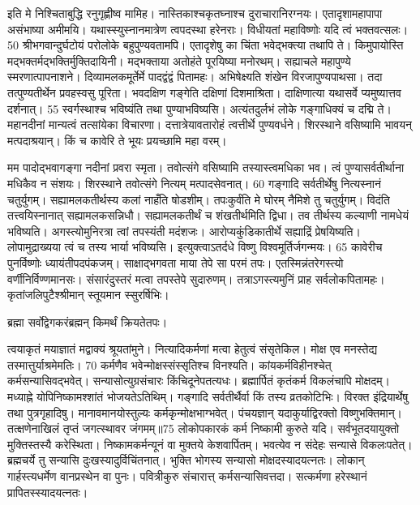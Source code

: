 इति मे निश्चिताबुद्धि रनुगृह्णीष्व मामिह।
 नास्तिकाश्चकृतघ्नाश्च दुराचारानिरग्नयः।
 एतादृशामहापापा असंभाष्या अमीमयि।
 यथास्स्युस्नानमात्रेण त्वपदस्था हरेनराः।
 विधीयतां महाविष्णोः यदि त्वं भक्तवत्सलः।
 50 श्रीभगवान्दुर्घटोयं परोलोके बहुपुण्यवतामपि।
 एतादृशेषु का चिंता भवेद्भक्त्या तथापि ते।
 किमुपायोस्ति मद्भक्तर्मद्भक्तिर्मुक्तिदायिनी।
 मद्भक्ताया अतोहंते पूरयिष्या मनोरथम्।
 सह्याचले महापुण्ये स्मरणात्पापनाशने।
 दिव्यामलकमूर्तेर्मे पादद्वंद्वं पितामहः।
 अभिषेक्ष्यति शंखेन विरजापुण्यपाथसा।
 तदा तत्पुण्यतीर्थेन प्रवहस्वसु पूरिता।
 भवदक्षिण गङ्गेति दक्षिणां दिशमाश्रिता।
 दाक्षिणात्या यथासर्वे प्यमुष्यात्तव दर्शनात्।
 55 स्वर्गस्थाश्च भविष्यंति तथा पुण्याभविष्यसि।
 अत्यंतदुर्लभं लोके गङ्गाधिक्यं च दद्मि ते।
 महानदीनां मान्यत्वं तत्सांयेका विचारणा।
 दत्तात्रेयावतारोहं त्वत्तीर्थे पुण्यवर्धने।
 शिरस्थाने वसिष्यामि भावयन् मत्पदाश्रयान्।
 किं च कावेरि ते भूयः प्रयच्छामि महा वरम्।
 
मम पादोद्भवागङ्गा नदीनां प्रवरा स्मृता।
 तवोत्संगे वसिष्यामि तस्यास्त्वमधिका भव।
 त्वं पुण्यासर्वतीर्थाना मधिकैव न संशयः।
 शिरस्थाने तवोत्संगे नित्यम् मत्पादसेवनात्।
 60 गङ्गादि सर्वतीर्थेषु नित्यस्नानं चतुर्युगम्।
 सह्यामलकतीर्थस्य कलां नाहँति षोडशीम्।
 तपःकुर्वंति मे घोरम् नैमिशे तु चतुर्युगम्।
 विदंति तत्त्वयिस्नानात् सह्यामलकसन्निधौ।
 सह्यामलकतीर्थं च शंखतीर्थमिति द्विधा।
 तव तीर्थस्य कल्याणी नामधेयं भविष्यति।
 अगस्त्योमुनिरत्रा त्वां तपस्यंती मदंशजः।
 आरोप्यकुंडिकातीर्थे सह्याद्रिं प्रेषयिष्यति।
 लोपामुद्राख्यया त्वं च तस्य भार्या भविष्यसि।
 इत्युक्त्वाऽतर्दधे विष्णु विश्वमूर्तिर्जगन्मयः।
 65 कावेरीच पुनर्विष्णोः ध्यायंतीपदपंकजम्।
 साक्षाद्भगवता माया तेपे सा परमं तपः।
 एतस्मिन्नंतरेगस्त्यो वर्णीनिर्विण्णमानसः।
 संसारंदुस्तरं मत्वा तपस्तेपे सुदारुणम्।
 तत्राऽगस्त्यमुनिं प्राह सर्वलोकपितामहः।
 कृतांजलिपुटैश्श्रीमान् स्तूयमान स्सुरर्षिभिः।
 
ब्रह्मा
सर्वोद्वेगकरंब्रह्मन् किमर्थं क्रियतेतपः।

त्वयाकृतं मयाज्ञातं मद्वाक्यं श्रूयतांमुने।
 नित्यादिकर्मणां मत्वा हेतुत्वं संसृतेकिल।
 मोक्ष एव मनस्तेद्य तस्मात्तुर्याश्रमेमतिः।
 70 कर्मणैव भवेन्मोक्षस्संस्सृतिश्च विनश्यति।
 कांयकर्मविहीनश्चेत् कर्मसन्यासिवद्भवेत्।
 सन्यासोत्युग्रसंचारः किंचिदूनेपतत्यधः।
 ब्रह्मार्पितं कृतंकर्म विकलंचापि मोक्षदम्।
 मध्याह्ने योपिनिष्कामश्शांतं भोजयतेऽतिथिम्।
 गङ्गादि सर्वतीर्थैर्वा किं तस्य व्रतकोटिभिः।
 विरक्त इंद्रियार्थेषु तथा पुत्रगृहादिषु।
 मानावमानयोस्तुल्यः कर्मकृन्मोक्षभाग्भवेत्।
 पंचयज्ञान् यदाकुर्याद्विरक्तो विष्णुभक्तिमान्।
 तत्क्षणेनाखिलं तृप्तं जगत्स्थावर जंगमम्॥75 लोकोपकारकं कर्म निष्कामी कुरुते यदि।
 सर्वभूतदयायुक्तो मुक्तिस्तस्यै करेस्थिता।
 निष्कामकर्मन्यूनं वा मुक्तये केशवार्पितम्।
 भवत्येव न संदेहः सन्यासे विकलःपतेत्।
 ब्रह्मचर्ये तु सन्यासि दुःखस्यादुर्विचिंतनात्।
 भुक्ति भोगस्य सन्यासो मोक्षदस्यादयत्नतः।
 लोकान् गार्हस्त्यधर्मेण वानप्रस्थेन वा पुनः।
 पवित्रीकुरु संचारात्त् कर्मसन्यासिवत्तदा।
 सत्कर्मणा हरेस्थानं प्रापितस्स्यादयत्नतः।
 

